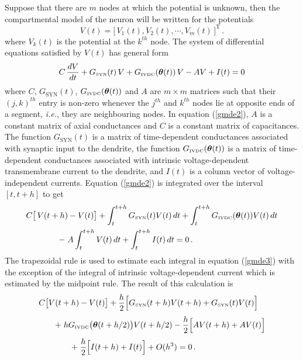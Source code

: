 Suppose that there are $m$ nodes at which the potential is
unknown, then the compartmental model of the neuron will be
written for the potentials
\begin{equation}\label{cmde1}
V(t)=\big[\,V_1(t),V_2(t),\cdots,V_m(t)\,]^\mathrm{T}\,.
\end{equation}
where $V_k(t)$ is the potential at the $k^{th}$ node. The system
of differential equations satisfied by $V(t)$ has general form
\begin{equation}\label{gmde2}
C\,\frac{dV}{dt}+G_{\mbox{\tiny SYN}}(t)\,V+G_{\mbox{\tiny IVDC}}(\boldsymbol{\theta}(t))\,V-AV+I(t)=0
\end{equation}
where $C$, $G_\mathrm{SYN}(t)$, $G_{\mbox{\tiny IVDC}}(\boldsymbol{\theta}(t))$
and $A$ are $m\times m$ matrices such that their $(j,k)^{th}$
entry is non-zero whenever the $j^{th}$ and $k^{th}$ nodes lie at
opposite ends of a segment, \emph{i.e.}, they are neighbouring
nodes. In equation (\ref{gmde2}), $A$ is a constant matrix of
axial conductances and $C$ is a constant matrix of capacitances.
The function $G_\mathrm{SYN}(t)$ is a matrix of time-dependent
conductances associated with synaptic input to the dendrite, the
function $G_{\mbox{\tiny IVDC}}(\boldsymbol{\theta}(t))$ is a matrix of
time-dependent conductances associated with intrinsic
voltage-dependent transmembrane current to the dendrite, and
$I(t)$ is a column vector of voltage-independent currents.
Equation (\ref{gmde2}) is integrated over the interval $[t,t+h]$
to get
\begin{equation}\label{gmde3}
\begin{array}{l}
\displaystyle C\big[\,V(t+h)-V(t)\big]+\int_t^{t+h}
G_{\mbox{\tiny SYN}}(t)V(t)\,dt+\int_t^{t+h}
G_{\mbox{\tiny IVDC}}(\boldsymbol{\theta}(t))V(t)\,dt\\[10pt]
\qquad\qquad\displaystyle-\;A\int_t^{t+h} V(t)\,dt+\int_t^{t+h} I(t)\,dt=0
\,.
\end{array}
\end{equation}
The trapezoidal rule is used to estimate each integral in equation
(\ref{gmde3}) with the exception of the integral of intrinsic
voltage-dependent current which is estimated by the midpoint rule.
The result of this calculation is
\begin{equation}\label{gmde4}
\begin{array}{l}
\displaystyle C \big[V(t+h)-V(t)\big]+\frac{h}{2}
\Big[G_{\mbox{\tiny SYN}}(t+h)V(t+h)+G_{\mbox{\tiny SYN}}(t)V(t)\Big]\\[10pt]
\displaystyle\qquad+\;h G_{\mbox{\tiny IVDC}}\big(\boldsymbol{\theta}(t+h/2)\big) V(t+h/2)
-\frac{h}{2} \Big[A V(t+h)+AV(t)\Big]\\[10pt]
\displaystyle\qquad\qquad\displaystyle+\;\frac{h}{2}\Big[I(t+h)+I(t)\Big] +O(h^3)=0\,.
\end{array}
\end{equation}
